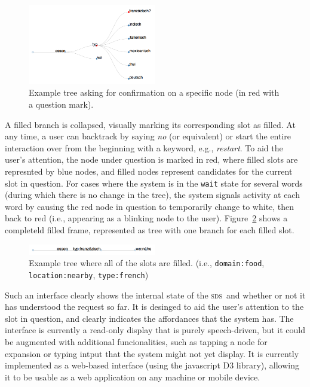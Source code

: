 \documentclass[11pt]{article}
\newcommand{\sds}[0]{\textsc{sds}}
\begin{document}
\begin{figure}[ht]
  \centering
      \includegraphics[width=0.5\textwidth]{figures/diatree-confirmation.png}	
      \caption{Example tree asking for confirmation on a specific node (in red with a question mark).\label{fig:confirm}}
\end{figure}

A filled  branch is collapsed, visually marking its corresponding slot as filled. At any time, a user can backtrack by saying \emph{no} (or equivalent) or start the entire interaction over from the beginning with a keyword, e.g., \emph{restart}. To aid the user's attention, the node under question is marked in red, where filled slots are represnted by blue nodes, and filled nodes represent candidates for the current slot in question. For cases where the system is in the \texttt{wait} state for several words (during which there is no change in the tree), the system signals activity at each word by causing the red node in question to temporarily change to white, then back to red (i.e., appearing as a blinking node to the user). Figure~\ref{fig:filled} shows a completeld filled frame, represented as tree with one branch for each filled slot.

\begin{figure}[ht]
  \centering
      \includegraphics[width=0.5\textwidth]{figures/diatree-filled.png}	
      \caption{Example tree where all of the slots are filled. (i.e., \texttt{domain:food}, \texttt{location:nearby}, \texttt{type:french}) \label{fig:filled}}
\end{figure}

Such an interface clearly shows the internal state of the \sds\ and whether or not it has understood the request so far. It is desinged to aid the user's attention to the slot in question, and clearly indicates the affordances that the system has. The interface is currently a read-only display that is purely speech-driven, but it could be augmented with additional funcionalities, such as tapping a node for expansion or typing intput that the system might not yet display. It is currently implemented as a web-based interface (using the javascript D3 library), allowing it to be usable as a web application on any machine or mobile device. 
\end{document}
